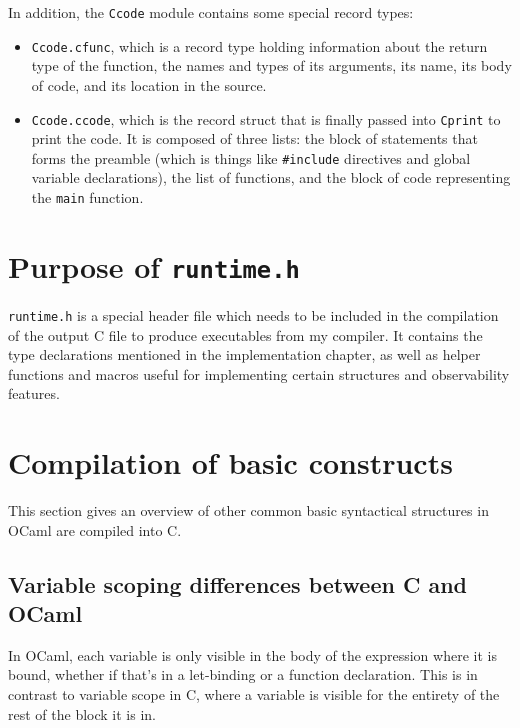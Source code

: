 In addition, the \texttt{Ccode} module contains some special record types:

\begin{itemize}

\item \texttt{Ccode.cfunc}, which is a record type holding information about the
    return type of the function, the names and types of its arguments, its name,
    its body of code, and its location in the source.

\item \texttt{Ccode.ccode}, which is the record struct that is finally passed
    into \texttt{Cprint} to print the code. It is composed of three lists: the
    block of statements that forms the preamble (which is things like
    \texttt{\#}\texttt{include} directives and global variable declarations),
    the list of functions, and the block of code representing the \texttt{main}
    function.

\end{itemize}

\section{Purpose of \texttt{runtime.h}}

\texttt{runtime.h} is a special header file which needs to be included in the
compilation of the output C file to produce executables from my compiler. It
contains the type declarations mentioned in the implementation chapter, as well
as helper functions and macros useful for implementing certain structures and
observability features.

\section{Compilation of basic constructs} \label{basic-constructs}

This section gives an overview of other common basic syntactical structures
in OCaml are compiled into C.

\subsection{Variable scoping differences between C and OCaml}
\label{variable-scoping}

In OCaml, each variable is only visible in the body of the expression where it
is bound, whether if that's in a let-binding or a function declaration. This is
in contrast to variable scope in C, where a variable is visible for the entirety
of the rest of the block it is in.

